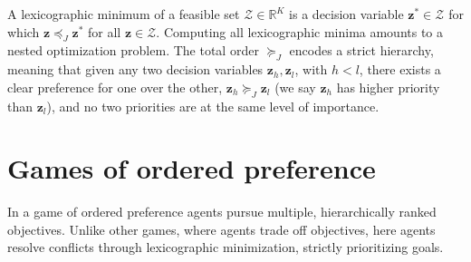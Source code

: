 A lexicographic minimum of a feasible set \(\mathcal{Z} \in \mathbb{R}^K\)
is a decision variable \(\mathbf{z}^* \in \mathcal{Z}\)
for which \(\mathbf{z} \preccurlyeq_J \mathbf{z}^*\) for all \(\mathbf{z} \in \mathcal{Z}\).
Computing all lexicographic minima amounts
to a nested optimization problem.
The total order \(\succcurlyeq_J\) encodes a strict hierarchy, meaning
that given any two decision variables \(\mathbf{z}_h, \mathbf{z}_l\),
with \(h < l\), there exists a clear preference
for one over the other, \(\mathbf{z}_h \succcurlyeq_J \mathbf{z}_l\)
(we say \(\mathbf{z}_h\) has higher priority than \(\mathbf{z}_l\)),
and no two priorities are
at the same level of importance.

\section{Games of ordered preference}
\label{sec:goop}

In a game of ordered preference agents pursue multiple,
hierarchically ranked objectives.
Unlike other games, where agents trade off objectives,
here agents resolve conflicts through lexicographic minimization,
strictly prioritizing goals. 

